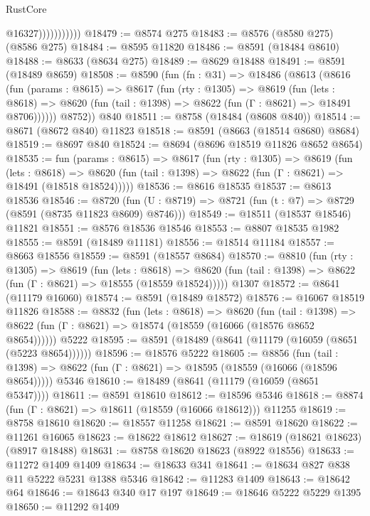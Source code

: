 \begin{lexlean}{RustCore}
\begin{coremodule}
                          @16327)))))))))))
@18479 := @8574 @275
@18483 := @8576 (@8580 @275) (@8586 @275)
@18484 := @8595 @11820
@18486 := @8591 (@18484 @8610)
@18488 := @8633 (@8634 @275)
@18489 := @8629 @18488
@18491 := @8591 (@18489 @8659)
@18508 := @8590
    (fun (fn : @31) =>
    @18486
      (@8613
        (@8616
          (fun (params : @8615) =>
          @8617
            (fun (rty : @1305) =>
            @8619
              (fun (lets : @8618) =>
              @8620 (fun (tail : @1398) => @8622 (fun (Γ : @8621) => @18491 @8706))))))
        @8752))
    @840
@18511 := @8758 (@18484 (@8608 @840))
@18514 := @8671 (@8672 @840) @11823
@18518 := @8591 (@8663 (@18514 @8680) @8684)
@18519 := @8697 @840
@18524 := @8694 (@8696 @18519 @11826 @8652 @8654)
@18535 := fun (params : @8615) =>
  @8617
    (fun (rty : @1305) =>
    @8619
      (fun (lets : @8618) =>
      @8620 (fun (tail : @1398) => @8622 (fun (Γ : @8621) => @18491 (@18518 @18524)))))
@18536 := @8616 @18535
@18537 := @8613 @18536
@18546 := @8720
    (fun (U : @8719) => @8721 (fun (t : @7) => @8729 (@8591 (@8735 @11823 @8609) @8746)))
@18549 := @18511 (@18537 @18546) @11821
@18551 := @8576 @18536 @18546
@18553 := @8807 @18535 @1982
@18555 := @8591 (@18489 @11181)
@18556 := @18514 @11184
@18557 := @8663 @18556
@18559 := @8591 (@18557 @8684)
@18570 := @8810
    (fun (rty : @1305) =>
    @8619
      (fun (lets : @8618) =>
      @8620 (fun (tail : @1398) => @8622 (fun (Γ : @8621) => @18555 (@18559 @18524)))))
    @1307
@18572 := @8641 (@11179 @16060)
@18574 := @8591 (@18489 @18572)
@18576 := @16067 @18519 @11826
@18588 := @8832
    (fun (lets : @8618) =>
    @8620
      (fun (tail : @1398) =>
      @8622 (fun (Γ : @8621) => @18574 (@18559 (@16066 (@18576 @8652 @8654))))))
    @5222
@18595 := @8591 (@18489 (@8641 (@11179 (@16059 (@8651 (@5223 @8654))))))
@18596 := @18576 @5222
@18605 := @8856
    (fun (tail : @1398) => @8622 (fun (Γ : @8621) => @18595 (@18559 (@16066 (@18596 @8654)))))
    @5346
@18610 := @18489 (@8641 (@11179 (@16059 (@8651 @5347))))
@18611 := @8591 @18610
@18612 := @18596 @5346
@18618 := @8874 (fun (Γ : @8621) => @18611 (@18559 (@16066 @18612))) @11255
@18619 := @8758 @18610
@18620 := @18557 @11258
@18621 := @8591 @18620
@18622 := @11261 @16065
@18623 := @18622 @18612
@18627 := @18619 (@18621 @18623) (@8917 @18488)
@18631 := @8758 @18620 @18623 (@8922 @18556)
@18633 := @11272 @1409 @1409
@18634 := @18633 @341
@18641 := @18634 @827 @838 @11 @5222 @5231 @1388 @5346
@18642 := @11283 @1409
@18643 := @18642 @64
@18646 := @18643 @340 @17 @197
@18649 := @18646 @5222 @5229 @1395
@18650 := @11292 @1409

\end{coremodule}
\end{lexlean}
